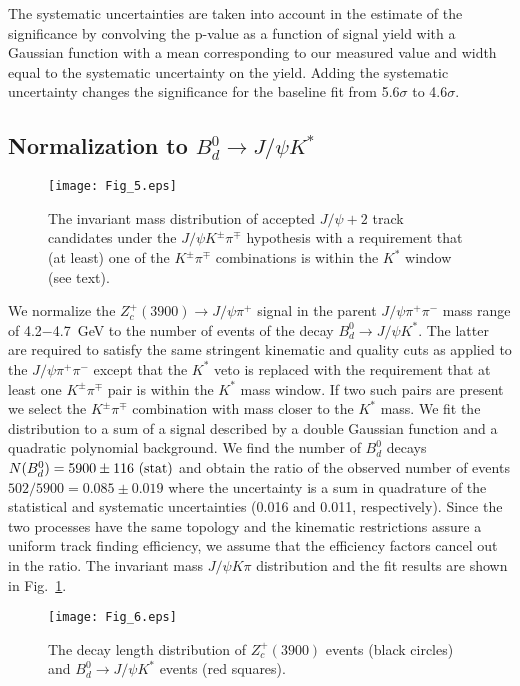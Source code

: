 \documentclass[aps,prd,twocolumn,superscriptaddress,groupedaddress,floatfix]{revtex4}
\begin{document}
 The systematic uncertainties are 
taken into account in the estimate of the significance 
by convolving the p-value as a function of signal yield
with a Gaussian function with a mean corresponding to our measured value and 
width equal to the systematic uncertainty on the yield.
Adding the systematic uncertainty changes the significance for the baseline
fit from 5.6$\sigma$ to 4.6$\sigma$.


\subsection{Normalization to {\boldmath $B_d^0 \rightarrow J/\psi K^*$}}

\begin{figure}[htb]
\texttt{[image: Fig\_5.eps]}
\caption{\label{fig:mb0} 
The invariant mass distribution  of  accepted  $J/\psi +2$ track candidates under
 the  $J/\psi K^{\pm}\pi^{\mp}$
hypothesis with a requirement that (at least) one of the $K^{\pm}\pi^{\mp}$ combinations is within the $K^*$ window
(see text). 
}
\end{figure}


We normalize the  $Z_c^+(3900) \rightarrow J/\psi \pi^+$ signal in the parent $J/\psi \pi^+ \pi^-$ mass
range of 4.2$-$4.7~GeV to the number of events of the decay $B_d^0 \rightarrow J/\psi K^*$.
The latter are required to satisfy the same stringent kinematic and quality cuts as applied
to the  $J/\psi \pi^+ \pi^-$ except that the $K^*$ veto is replaced with the requirement
that at least one $K^{\pm}\pi^{\mp}$ pair is within the $K^*$ mass window. If two such pairs are present
 we select the $K^{\pm}\pi^{\mp}$ combination 
with mass closer to the $K^*$ mass. 
We fit the distribution to a sum of a signal described by a double Gaussian function
and a quadratic polynomial background.
We find  the  number of $B^0_d$ decays
$N(B^0_d)= 5900 \pm 116~({\rm stat})$  and  obtain the ratio of 
the observed number of events 
$502/5900=0.085\pm0.019$ where the uncertainty 
is a sum in quadrature of the statistical and systematic uncertainties (0.016 and 0.011, respectively).
Since the two processes have the same topology and the kinematic restrictions assure
a uniform track finding efficiency, we assume that the efficiency factors cancel out in the ratio.
The invariant mass $J/\psi K\pi$ distribution and the fit results are
shown in  Fig.~\ref{fig:mb0}. 


\begin{figure}[htb]
\texttt{[image: Fig\_6.eps]}
\caption{\label{fig:lxy} 
The decay length distribution of    $Z_c^+(3900)$ events (black  circles)
and 
$B^0_d \rightarrow J/\psi  K^*$ events (red squares).
}
\end{figure}
\end{document}
